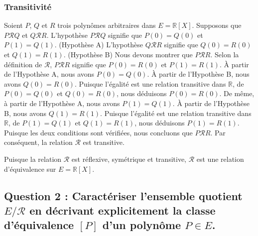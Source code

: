 \documentclass{report}
\begin{document}
\subsubsection*{Transitivité}
Soient $P$, $Q$ et $R$ trois polynômes arbitraires dans $E = \mathbb{R}[X]$.
Supposons que $P \mathcal{R} Q$ et $Q \mathcal{R} R$.
L'hypothèse $P \mathcal{R} Q$ signifie que $P(0) = Q(0)$ et $P(1) = Q(1)$. (Hypothèse A)
L'hypothèse $Q \mathcal{R} R$ signifie que $Q(0) = R(0)$ et $Q(1) = R(1)$. (Hypothèse B)
Nous devons montrer que $P \mathcal{R} R$.
Selon la définition de $\mathcal{R}$, $P \mathcal{R} R$ signifie que $P(0) = R(0)$ et $P(1) = R(1)$.
À partir de l'Hypothèse A, nous avons $P(0) = Q(0)$.
À partir de l'Hypothèse B, nous avons $Q(0) = R(0)$.
Puisque l'égalité est une relation transitive dans $\mathbb{R}$, de $P(0) = Q(0)$ et $Q(0) = R(0)$, nous déduisons $P(0) = R(0)$.
De même, à partir de l'Hypothèse A, nous avons $P(1) = Q(1)$.
À partir de l'Hypothèse B, nous avons $Q(1) = R(1)$.
Puisque l'égalité est une relation transitive dans $\mathbb{R}$, de $P(1) = Q(1)$ et $Q(1) = R(1)$, nous déduisons $P(1) = R(1)$.
Puisque les deux conditions sont vérifiées, nous concluons que $P \mathcal{R} R$.
Par conséquent, la relation $\mathcal{R}$ est transitive.

Puisque la relation $\mathcal{R}$ est réflexive, symétrique et transitive, $\mathcal{R}$ est une relation d'équivalence sur $E = \mathbb{R}[X]$.

\subsection*{Question 2 : Caractériser l'ensemble quotient $E/\mathcal{R}$ en décrivant explicitement la classe d'équivalence $[P]$ d'un polynôme $P \in E$.}
\end{document}

